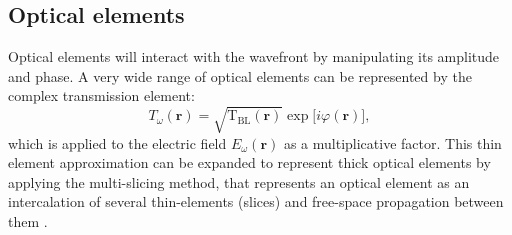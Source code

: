 \documentclass{iucr}              %
\begin{document}



\subsection{Optical elements}\label{sec:OE}

Optical elements will interact with the wavefront by manipulating its amplitude and phase. A very wide range of optical elements can be represented by the complex transmission element:
 \begin{equation}\label{eq:trans_el}
T_\omega(\textbf{r})=\sqrt{\mathrm{T}_\mathrm{BL}(\textbf{r})}\exp{\big[ i\varphi(\textbf{r})\big]},
\end{equation}
which is applied to the electric field $E_\omega(\textbf{r})$ as a multiplicative factor. This thin element approximation can be expanded to represent thick optical elements by applying the multi-slicing method, that represents an optical element as an intercalation of several thin-elements (slices) and free-space propagation between them \cite{paganin_book, Li2017, Munro2019}. 
\end{document}
